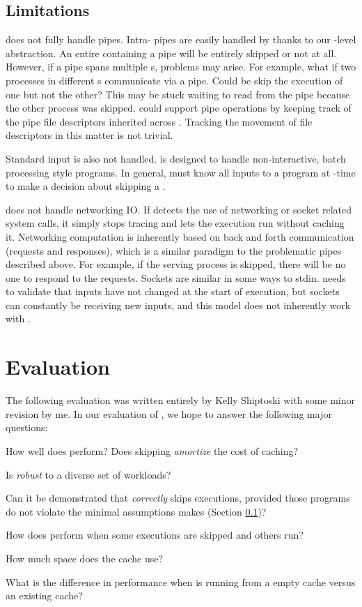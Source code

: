 \subsection{Limitations} \label{sec:limitations}
\pc does not fully handle pipes. Intra-\cacheunit{} pipes are easily handled by \pc thanks to our \cacheunit{}-level abstraction. An entire \cacheunit{} containing a pipe will be entirely skipped or not at all. However, if a pipe spans multiple \cacheunit{}s,  problems may arise. For example, what if two processes in different \cacheunit{}s communicate via a pipe. Could be skip the execution of one \cacheunit but not the other? This \cacheunit{} may be stuck waiting to read from the pipe because the other process was skipped. \pc could support pipe operations by keeping track of the pipe file descriptors inherited across . Tracking the movement of file descriptors in this matter is not trivial.

Standard input is also not handled. \pc is designed to handle non-interactive, batch processing style programs. In general, \pc must know all inputs to a program at -time to make a decision about skipping a \cacheunit{}.

\pc does not handle networking IO. If \pc detects the use of networking or socket related system calls, it simply stops tracing and lets the execution run without caching it. Networking computation is inherently based on back and forth communication (requests and responses), which is a similar paradigm to the problematic pipes described above. For example, if the serving process is skipped, there will be no one to respond to the requests. Sockets are similar in some ways to stdin. \pc needs to validate that inputs have not changed at the start of execution, but sockets can constantly be receiving new inputs, and this model does not inherently work with \pc.

\section{Evaluation}
The following evaluation was written entirely by Kelly Shiptoski with some minor revision by me. In our evaluation of \pc, we hope to answer the following major questions:
\begin{compactitem}
 
    \item How well does \pc perform? Does skipping \textit{amortize} the cost of caching?
    \item Is \pc \textit{robust} to a diverse set of workloads?
    \item Can it be demonstrated that \pc \textit{correctly} skips executions, provided those programs do not violate the minimal assumptions \pc makes (Section \ref{sec:limitations})?
    \item How does \pc perform when some executions are skipped and others run?
    \item How much space does the cache use?
    \item What is the difference in performance when \pc is running from a empty cache versus an existing cache?
\end{compactitem}

